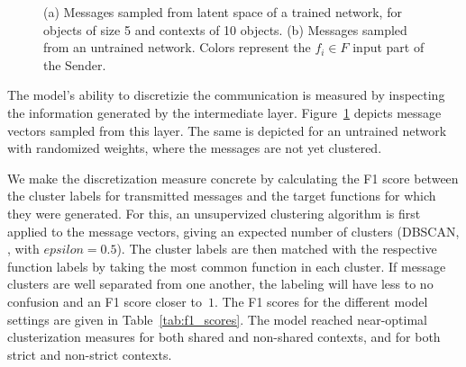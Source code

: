 \documentclass[11pt,a4paper]{article}
\begin{document}
\begin{figure}[ht]
  \centering
  \hspace{1cm}
  \caption{(a) Messages sampled from latent space of a trained network, for objects of size 5 and contexts of 10 objects. (b) Messages sampled from an untrained network. Colors represent the $f_i \in F$ input part of the Sender.}
 \label{fig:messages}
\end{figure}

The model's ability to discretizie the communication is measured by inspecting the information generated by the intermediate layer. Figure~\ref{fig:messages} depicts message vectors sampled from this layer. The same is depicted for an untrained network with randomized weights, where the messages are not yet clustered. 

We make the discretization measure concrete by calculating the F1 score between the cluster labels for transmitted messages and the target functions for which they were generated. For this, an unsupervized clustering algorithm is first applied to the message vectors, giving an expected number of clusters (DBSCAN, \citealp{ester_density-based_1996}, with $epsilon = 0.5$). The cluster labels are then matched with the respective function labels by taking the most common function in each cluster. If message clusters are well separated from one another, the labeling will have less to no confusion and an F1 score closer to~$1$. The F1 scores for the different model settings are given in Table~\ref{tab:f1_scores}. The model reached near-optimal clusterization measures for both shared and non-shared contexts, and for both strict and non-strict contexts. 
\end{document}
